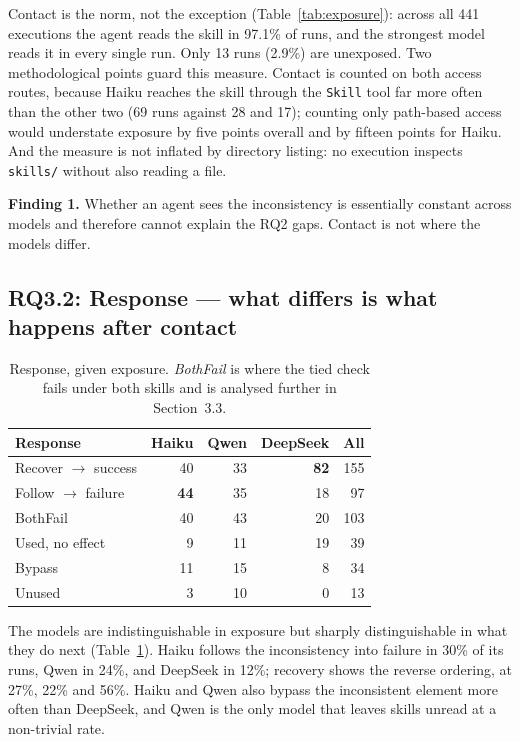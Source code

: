 Contact is the norm, not the exception (Table~\ref{tab:exposure}): across all 441 executions the agent
reads the skill in 97.1\% of runs, and the strongest model reads it in every single run. Only 13 runs
(2.9\%) are unexposed. Two methodological points guard this measure. Contact is counted on both access
routes, because Haiku reaches the skill through the \texttt{Skill} tool far more often than the other
two (69 runs against 28 and 17); counting only path-based access would understate exposure by five
points overall and by fifteen points for Haiku. And the measure is not inflated by directory listing:
no execution inspects \texttt{skills/} without also reading a file.

\textbf{Finding 1.} Whether an agent sees the inconsistency is essentially constant across models and
therefore cannot explain the RQ2 gaps. Contact is not where the models differ.

\subsection{RQ3.2: Response --- what differs is what happens after contact}
\label{sec:rq3-response}

\begin{table}[t]
\centering\small
\caption{Response, given exposure. \emph{BothFail} is where the tied check fails under both skills
and is analysed further in Section~3.3.}
\label{tab:response}
\begin{tabular}{@{}lrrrr@{}}
\toprule
Response & Haiku & Qwen & DeepSeek & All \\
\midrule
Recover $\rightarrow$ success   & 40 & 33 & \textbf{82} & 155 \\
Follow $\rightarrow$ failure   & \textbf{44} & 35 & 18 &  97 \\
BothFail                       & 40 & 43 & 20 & 103 \\
Used, no effect                &  9 & 11 & 19 &  39 \\
Bypass                         & 11 & 15 &  8 &  34 \\
Unused                         &  3 & 10 &  0 &  13 \\
\bottomrule
\end{tabular}
\end{table}

The models are indistinguishable in exposure but sharply distinguishable in what they do next
(Table~\ref{tab:response}). Haiku follows the inconsistency into failure in 30\% of its runs, Qwen in
24\%, and DeepSeek in 12\%; recovery shows the reverse ordering, at 27\%, 22\% and 56\%. Haiku and
Qwen also bypass the inconsistent element more often than DeepSeek, and Qwen is the only model that
leaves skills unread at a non-trivial rate.

